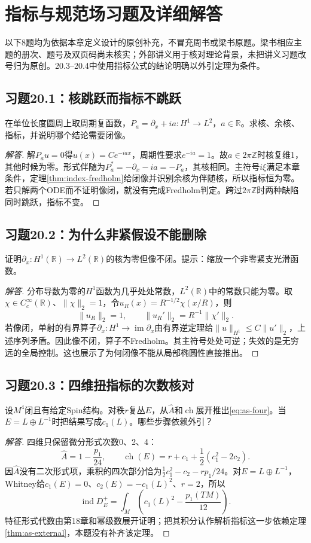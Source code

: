 \section{指标与规范场习题及详细解答}
以下8题均为依据本章定义设计的原创补充，不冒充周书或梁书原题。梁书相应主题的册次、题号及双页码尚未核实；外部讲义用于核对理论背景，未把讲义习题改号归为原创。20.3--20.4中使用指标公式的结论明确以外引定理为条件。

\subsection*{习题20.1：核跳跃而指标不跳跃}
在单位长度圆周上取周期复函数，$P_a=\partial_x+ia:H^1\to L^2$，$a\in\mathbb R$。求核、余核、指标，并说明哪个结论需要闭像。
\begin{proof}[解答]
解$P_au=0$得$u(x)=Ce^{-iax}$，周期性要求$e^{-ia}=1$。故$a\in2\pi\mathbb Z$时核复维1，其他时候为零。形式伴随为$P_a^*=-\partial_x-ia=-P_a$，其核相同。主符号$i\xi$满足本章条件，定理\ref{thm:index-fredholm}给闭像并识别余核为伴随核，所以指标恒为零。若只解两个ODE而不证明像闭，就没有完成Fredholm判定。跨过$2\pi\mathbb Z$时两种缺陷同时跳跃，指标不变。
\end{proof}

\subsection*{习题20.2：为什么非紧假设不能删除}
证明$\partial_x:H^1(\mathbb R)\to L^2(\mathbb R)$的核为零但像不闭。提示：缩放一个非零紧支光滑函数。
\begin{proof}[解答]
分布导数为零的$H^1$函数为几乎处处常数，$L^2(\mathbb R)$中的常数只能为零。取$\chi\in C_c^\infty(\mathbb R)$、$\|\chi\|_2=1$，令$u_R(x)=R^{-1/2}\chi(x/R)$，则
\[
 \|u_R\|_2=1,\qquad \|u_R'\|_2=R^{-1}\|\chi'\|_2.
\]
若像闭，单射的有界算子$\partial_x:H^1\to\operatorname{im}\partial_x$由有界逆定理给$\|u\|_{H^1}\leq C\|u'\|_2$，上述序列矛盾。因此像不闭，算子不Fredholm。其主符号处处可逆；失效的是无穷远的全局控制。这也展示了为何闭像不能从局部椭圆性直接推出。
\end{proof}

\subsection*{习题20.3：四维扭指标的次数核对}
设$M^4$闭且有给定Spin结构。对秩$r$复丛$E$，从$\widehat A$和$\operatorname{ch}$展开推出\eqref{eq:as-four}。当$E=L\oplus L^{-1}$时把结果写成$c_1(L)$。哪些步骤依赖外引？
\begin{proof}[解答]
四维只保留微分形式次数0、2、4：
\[
 \widehat A=1-\frac{p_1}{24},\qquad
 \operatorname{ch}(E)=r+c_1+\frac12(c_1^2-2c_2).
\]
因$\widehat A$没有二次形式项，乘积的四次部分恰为$\frac12c_1^2-c_2-rp_1/24$。对$E=L\oplus L^{-1}$，Whitney给$c_1(E)=0$、$c_2(E)=-c_1(L)^2$、$r=2$，所以
\[
 \operatorname{ind}D_E^+=\int_M\left(c_1(L)^2-\frac{p_1(TM)}{12}\right).
\]
特征形式代数由第18章和幂级数展开证明；把其积分认作解析指标这一步依赖定理\ref{thm:as-external}，本题没有补齐该定理。
\end{proof}

